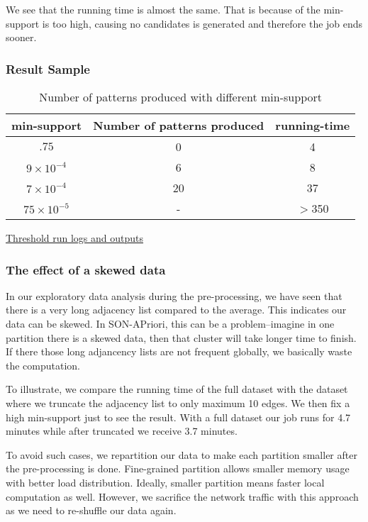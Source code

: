 \documentclass[11pt]{article}
\begin{document}
We see that the running time is almost the same. 
That is because of the min-support is too high, causing no candidates is generated and therefore the job ends sooner.

\subsubsection{Result Sample}

\begin{table}[h!]
    \centering
    \begin{tabular}{||c c c||}
        \hline
        min-support & Number of patterns produced & running-time \\
        \hline\hline
        $.75$ & 0 & 4 \\
        $9 \times 10^{-4}$ & 6 & 8 \\
        $7 \times 10^{-4}$ & 20 & 37 \\
        $75 \times 10^{-5}$ & - & $>$350 \\
        \hline
    \end{tabular}
    \caption{Number of patterns produced with different min-support}
    \label{table:5}
\end{table}

\href{https://github.ccs.neu.edu/prdx/CS6240-Project/tree/master/thresholdRuns}{Threshold run logs and outputs}

\subsubsection{The effect of a skewed data}

In our exploratory data analysis during the pre-processing, we have seen that there is a very long adjacency list compared to the average.
This indicates our data can be skewed.
In SON-APriori, this can be a problem--imagine in one partition there is a skewed data, then that cluster will take longer time to finish.
If there those long adjancency lists are not frequent globally, we basically waste the computation.

To illustrate, we compare the running time of the full dataset with the dataset where we truncate the adjacency list to only maximum 10 edges.
We then fix a high min-support just to see the result.
With a full dataset our job runs for 4.7 minutes while after truncated we receive 3.7 minutes. 

To avoid such cases, we repartition our data to make each partition smaller after the pre-processing is done.
Fine-grained partition allows smaller memory usage with better load distribution.
Ideally, smaller partition means faster local computation as well.
However, we sacrifice the network traffic with this approach as we need to re-shuffle our data again.
\end{document}
